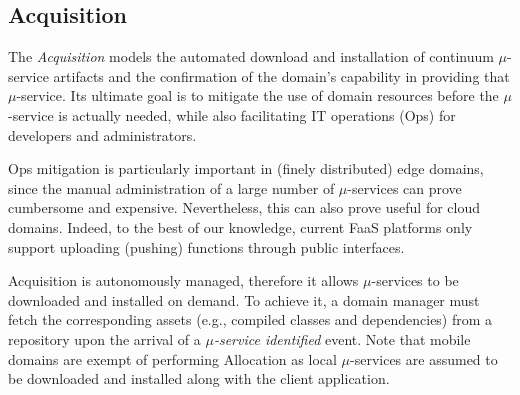 


\subsection{Acquisition}\label{sec:A3-E-acquisition}

The \textit{Acquisition} models the automated download and installation of continuum $\mu$-service artifacts and the confirmation of the domain's capability in providing that $\mu$-service. Its ultimate goal is to mitigate the use of domain resources before the $\mu$-service is actually needed, while also facilitating IT operations (Ops) for developers and administrators. 

Ops mitigation is particularly important in (finely distributed) edge domains, since the manual administration of a large number of $\mu$-services can prove cumbersome and expensive. Nevertheless, this can also prove useful for cloud domains. Indeed, to the best of our knowledge, current FaaS platforms only support uploading (pushing) functions through public interfaces. 

Acquisition is autonomously managed, therefore it allows $\mu$-services to be downloaded 
and installed on demand. To achieve it, a domain manager must fetch the corresponding assets (e.g., compiled classes and dependencies) from a repository upon the arrival of a \textit{$\mu$-service identified} event. Note that mobile domains are exempt of performing Allocation as local $\mu$-services are assumed to be downloaded and installed along with the client application.

